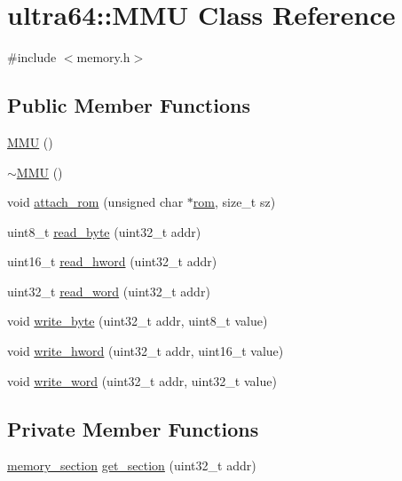 \hypertarget{classultra64_1_1_m_m_u}{}\section{ultra64\+:\+:M\+MU Class Reference}
\label{classultra64_1_1_m_m_u}


{\ttfamily \#include $<$memory.\+h$>$}

\subsection*{Public Member Functions}
\begin{DoxyCompactItemize}
\item 
\hyperlink{classultra64_1_1_m_m_u_a2fdb1cba73825c3988f2a1216e806c7c}{M\+MU} ()
\item 
\hyperlink{classultra64_1_1_m_m_u_a9ee9394ce2502116d7773d5f6123a24e}{$\sim$\+M\+MU} ()
\item 
void \hyperlink{classultra64_1_1_m_m_u_aba8d57fd9862ade57d54b1581dd93682}{attach\+\_\+rom} (unsigned char $\ast$\hyperlink{classultra64_1_1_m_m_u_a7ad1ee24b85de6513bf53ba6c963f529}{rom}, size\+\_\+t sz)
\item 
uint8\+\_\+t \hyperlink{classultra64_1_1_m_m_u_a8cdfede1aebd137ae20dfda84f0e23a1}{read\+\_\+byte} (uint32\+\_\+t addr)
\item 
uint16\+\_\+t \hyperlink{classultra64_1_1_m_m_u_a0e4bb683637877aba6c5def53c719b0f}{read\+\_\+hword} (uint32\+\_\+t addr)
\item 
uint32\+\_\+t \hyperlink{classultra64_1_1_m_m_u_a894a894a4340798c457e7ad41c3dd2ff}{read\+\_\+word} (uint32\+\_\+t addr)
\item 
void \hyperlink{classultra64_1_1_m_m_u_aac98a1626ea3f4168c0a3c5ae6036289}{write\+\_\+byte} (uint32\+\_\+t addr, uint8\+\_\+t value)
\item 
void \hyperlink{classultra64_1_1_m_m_u_ab594e1f0fe4958b521af5408aab46456}{write\+\_\+hword} (uint32\+\_\+t addr, uint16\+\_\+t value)
\item 
void \hyperlink{classultra64_1_1_m_m_u_a4dd4d9827368407081996591918fee9c}{write\+\_\+word} (uint32\+\_\+t addr, uint32\+\_\+t value)
\end{DoxyCompactItemize}
\subsection*{Private Member Functions}
\begin{DoxyCompactItemize}
\item 
\hyperlink{structultra64_1_1memory__section}{memory\+\_\+section} \hyperlink{classultra64_1_1_m_m_u_a30dc6643202a4b3a435cd7458fb4b6b4}{get\+\_\+section} (uint32\+\_\+t addr)
\end{DoxyCompactItemize}
